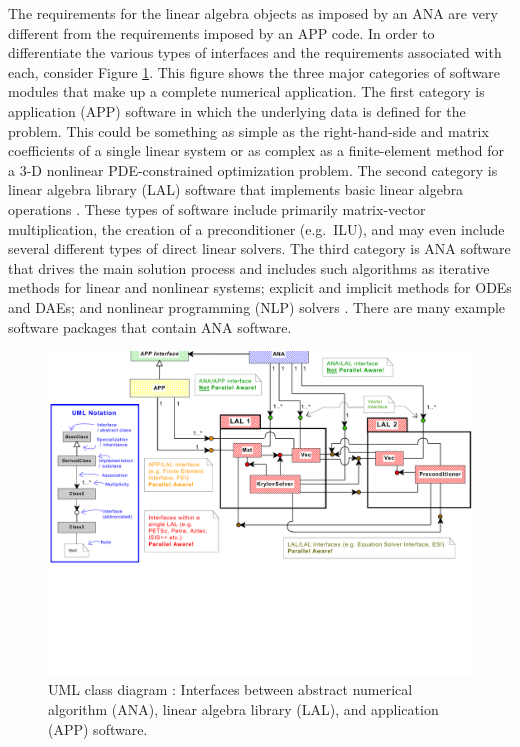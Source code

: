 \documentclass[pdf,ps2pdf,11pt]{SANDreport}
\begin{document}
The requirements for the linear algebra objects as imposed by an ANA
are very different from the requirements imposed by an APP code.  In
order to differentiate the various types of interfaces and the
requirements associated with each, consider Figure
{}\ref{tsfcore:fig:ANA_LAL_APP}.  This figure shows the three major
categories of software modules that make up a complete numerical
application.  The first category is application (APP) software in
which the underlying data is defined for the problem.  This could be
something as simple as the right-hand-side and matrix coefficients of
a single linear system or as complex as a finite-element method for a
3-D nonlinear PDE-constrained optimization problem.  The second
category is linear algebra library (LAL) software that implements
basic linear algebra operations {}\cite{ref:demmel_1997,
ref:anderson_1995, ref:blackford_et_al_1997, ref:aztec, ref:petsc,
ref:trilinos}. These types of software include primarily matrix-vector
multiplication, the creation of a preconditioner (e.g.~ILU), and may
even include several different types of direct linear solvers.  The
third category is ANA software that drives the main solution process
and includes such algorithms as iterative methods for linear and
nonlinear systems; explicit and implicit methods for ODEs and DAEs;
and nonlinear programming (NLP) solvers
{}\cite{ref:nocedal_wright_1999}.  There are many example software
packages {}\cite{ref:petsc,ref:aztec,ref:trilinos,ref:pvode,ref:tao}
that contain ANA software.

{\bsinglespace
\begin{figure}[t]
\begin{center}
\includegraphics*[bb= 0.245in 2.95in 10.85in 8.60in,angle=0,scale=0.50
]{figures/analal}
\end{center}
\caption{
\label{tsfcore:fig:ANA_LAL_APP}
UML {}\cite{ref:booch_et_al_1999} class diagram : Interfaces between abstract numerical algorithm
(ANA), linear algebra library (LAL), and application (APP) software.
}
\end{figure}
\esinglespace}
\end{document}
